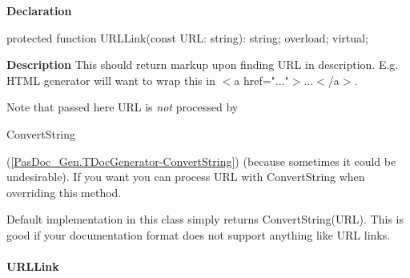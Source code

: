 \documentclass{report}
\newif\ifpdf
\begin{document}
\label{PasDoc_Gen.TDocGenerator-URLLink}
\begin{list}{}{
\setlength{\itemindent}{0cm}
\setlength{\listparindent}{0cm}
\setlength{\leftmargin}{\evensidemargin}
\addtolength{\leftmargin}{\tmplength}
\settowidth{\labelsep}{X}
\addtolength{\leftmargin}{\labelsep}
\setlength{\labelwidth}{\tmplength}
}
\item[\textbf{Declaration}\hfill]
\ifpdf
\begin{flushleft}
\fi
\begin{ttfamily}
protected function URLLink(const URL: string): string; overload; virtual;\end{ttfamily}

\ifpdf
\end{flushleft}
\fi

\par
\item[\textbf{Description}]
This should return markup upon finding URL in description. E.g. HTML generator will want to wrap this in {$<$}a href="..."{$>$}...{$<$}/a{$>$}.

Note that passed here URL is \textit{not} processed by \begin{ttfamily}ConvertString\end{ttfamily}(\ref{PasDoc_Gen.TDocGenerator-ConvertString}) (because sometimes it could be undesirable). If you want you can process URL with ConvertString when overriding this method.

Default implementation in this class simply returns ConvertString(URL). This is good if your documentation format does not support anything like URL links.

\end{list}
\paragraph*{URLLink}\hspace*{\fill}
\end{document}
